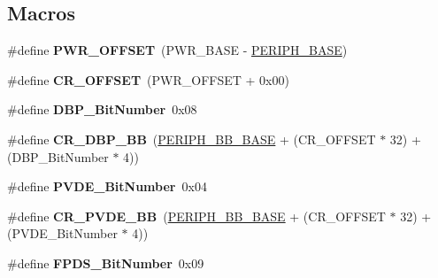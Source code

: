 \subsection*{Macros}
\begin{DoxyCompactItemize}
\item 
\hypertarget{group___p_w_r_ga7f88bce73931300319824f22578f90de}{}\#define {\bfseries P\+W\+R\+\_\+\+O\+F\+F\+S\+E\+T}~(P\+W\+R\+\_\+\+B\+A\+S\+E -\/ \hyperlink{group___peripheral__memory__map_ga9171f49478fa86d932f89e78e73b88b0}{P\+E\+R\+I\+P\+H\+\_\+\+B\+A\+S\+E})\label{group___p_w_r_ga7f88bce73931300319824f22578f90de}

\item 
\hypertarget{group___p_w_r_gafa1d3d0ea72132df651c76fc1bdffffc}{}\#define {\bfseries C\+R\+\_\+\+O\+F\+F\+S\+E\+T}~(P\+W\+R\+\_\+\+O\+F\+F\+S\+E\+T + 0x00)\label{group___p_w_r_gafa1d3d0ea72132df651c76fc1bdffffc}

\item 
\hypertarget{group___p_w_r_ga36ff45d972bf94f31f172fd53cf44d23}{}\#define {\bfseries D\+B\+P\+\_\+\+Bit\+Number}~0x08\label{group___p_w_r_ga36ff45d972bf94f31f172fd53cf44d23}

\item 
\hypertarget{group___p_w_r_ga799ab60bdbcfc1076cf2d7f206d09b0c}{}\#define {\bfseries C\+R\+\_\+\+D\+B\+P\+\_\+\+B\+B}~(\hyperlink{group___peripheral__memory__map_gaed7efc100877000845c236ccdc9e144a}{P\+E\+R\+I\+P\+H\+\_\+\+B\+B\+\_\+\+B\+A\+S\+E} + (C\+R\+\_\+\+O\+F\+F\+S\+E\+T $\ast$ 32) + (D\+B\+P\+\_\+\+Bit\+Number $\ast$ 4))\label{group___p_w_r_ga799ab60bdbcfc1076cf2d7f206d09b0c}

\item 
\hypertarget{group___p_w_r_ga17d618eb800c401ef9c6789c9374eaf8}{}\#define {\bfseries P\+V\+D\+E\+\_\+\+Bit\+Number}~0x04\label{group___p_w_r_ga17d618eb800c401ef9c6789c9374eaf8}

\item 
\hypertarget{group___p_w_r_ga49f51ef8285a6be76fd204d49a00709c}{}\#define {\bfseries C\+R\+\_\+\+P\+V\+D\+E\+\_\+\+B\+B}~(\hyperlink{group___peripheral__memory__map_gaed7efc100877000845c236ccdc9e144a}{P\+E\+R\+I\+P\+H\+\_\+\+B\+B\+\_\+\+B\+A\+S\+E} + (C\+R\+\_\+\+O\+F\+F\+S\+E\+T $\ast$ 32) + (P\+V\+D\+E\+\_\+\+Bit\+Number $\ast$ 4))\label{group___p_w_r_ga49f51ef8285a6be76fd204d49a00709c}

\item 
\hypertarget{group___p_w_r_gad99a3da921e3e64587f6b9505ecba665}{}\#define {\bfseries F\+P\+D\+S\+\_\+\+Bit\+Number}~0x09\label{group___p_w_r_gad99a3da921e3e64587f6b9505ecba665}


\end{DoxyCompactItemize}
